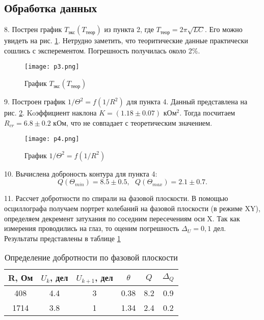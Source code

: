 \subsection{Обработка данных}

8. Пострен график $T_\text{экс}(T_\text{теор})$ из пункта 2, где $T_\text{теор}  = 2\pi\sqrt{LC}$. Его можно увидеть на рис. \ref{pic:p3}. Нетрудно заметить, что теоритические данные практически сошлись с эксперементом. Погрешность получилась около 2\%.

\begin{figure}[h]
    \centering
    \texttt{[image: p3.png]}
    \caption{График $T_\text{экс}(T_\text{теор})$}
    \label{pic:p3}
\end{figure}

9. Построен график $1/\Theta^2 = f(1/R^2)$ для пункта 4. Данный представлена на рис. \ref{pic:p4}. Koэффициент наклона $K = (1.18 \pm 0.07)$ кОм$^2$. Тогда посчитаем $R_{cr} = 6.8 \pm 0.2$ кОм, что не совпадает с теоретическим значением.

\begin{figure}[h]
    \centering
    \texttt{[image: p4.png]}
    \caption{График $1/\Theta^2 = f(1/R^2)$}
    \label{pic:p4}
\end{figure}

10. Вычислена доброность контура для пункта 4:
\[Q(\Theta_{min}) = 8.5 \pm 0.5, \text{      } Q(\Theta_{max}) = 2.1 \pm 0.7.\]

11. Рассчет добротности по спирали на фазовой плоскости. В помощью осциллографа получаем портрет колебаний на фазовой плоскости (в режиме XY), определяем декремент затухания по соседним пересечениям оси X. Так как измерения проводились на глаз, то оценим погрешность $\Delta_U = 0,1$ дел. Результаты представлены в таблице \ref{tab:6}

	\begin{table}[h]
		\centering
		\begin{tabular}{|c|c|c|c|c|c|}
			\hline
			R, Ом & $U_k$, дел & $U_{k + 1}$, дел & $\theta$ & $Q$ & $\Delta_{Q}$  \\ \hline
			408 & 4.4 & 3 & 0.38 & 8.2 & 0.9 \\ \hline
			1714 & 3.8 & 1 & 1.34 & 2.4 & 0.2 \\ \hline
		\end{tabular}
		\caption{Определение добротности по фазовой плоскости}
        \label{tab:6}
	\end{table}

